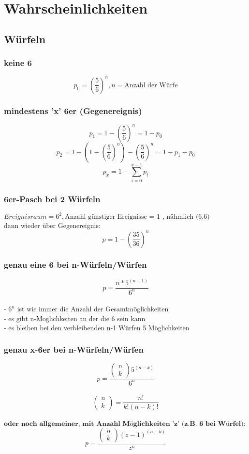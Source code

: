 \documentclass{article}
\begin{document}
\section{Wahrscheinlichkeiten}
\subsection{W\"urfeln}
\subsubsection{keine 6}
\[
	p_0 = \left( \frac{5}{6} \right)^n , n = \text{Anzahl der W\"urfe}
\]
\subsubsection{mindestens 'x' 6er (Gegenereignis)}
\[	
	p_1 = 1 - \left( \frac{5}{6} \right)^n = 1 - p_0
\]	
\[		
	p_2 = 1-\left(1 - \left( \frac{5}{6} \right)^n\right)-\left( \frac{5}{6} \right)^n = 1-p_1 -p_0
\]
\[
	p_x = 1 - \sum_{i=0}^{x-1} p_i
\]
\subsubsection{6er-Pasch bei 2 W\"urfeln}
$Ereignisraum = 6^2 , \text{Anzahl g\"unstiger Ereignisse = 1 , n\"ahmlich (6,6)}$\\
dann wieder \"uber Gegenereignis: \\
\[ p=1-\left(\frac{35}{36}\right)^n \]
\subsubsection{genau eine 6 bei n-W\"urfeln/W\"urfen}
\[ p= \frac{n*5^{(n-1)}}{6^n}\]\\
- $6^n $ ist wie immer die Anzahl der Gesamtm\"oglichkeiten \\
- es gibt n-Moglichkeiten an der die 6 sein kann \\
- es bleiben bei den verbleibenden n-1 W\"urfen 5 M\"oglichkeiten
\subsubsection{genau x-6er bei n-W\"urfeln/W\"urfen}
\[ p= \frac{\begin{pmatrix}
			n\\k
\end{pmatrix}5^{(n-k)}}{6^n}\]\\
\[\begin{pmatrix}
		n\\k
	\end{pmatrix}= \frac{n!}{k!(n-k)!}
\]\\
$\textbf{oder noch allgemeiner, mit Anzahl M\"oglichkeiten 'z' (z.B. 6 bei W\"urfel):}$\[
	p= \frac{\begin{pmatrix}
			n\\k
	\end{pmatrix}(z-1)^{(n-k)}}{z^n}
\]
\end{document}
